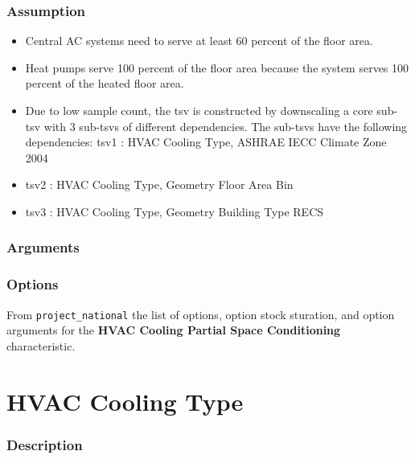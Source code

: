 \subsubsection{Assumption}\label{assumption-37}

\begin{itemize}
 
\item
  Central AC systems need to serve at least 60 percent of the floor
  area.
\item
  Heat pumps serve 100 percent of the floor area because the system
  serves 100 percent of the heated floor area.
\item
  Due to low sample count, the tsv is constructed by downscaling a core
  sub-tsv with 3 sub-tsvs of different dependencies. The sub-tsvs have
  the following dependencies: tsv1 : \textquotesingle HVAC Cooling
  Type\textquotesingle, \textquotesingle ASHRAE IECC Climate Zone
  2004\textquotesingle{}
\item
  tsv2 : \textquotesingle HVAC Cooling Type\textquotesingle,
  \textquotesingle Geometry Floor Area Bin\textquotesingle{}
\item
  tsv3 : \textquotesingle HVAC Cooling Type\textquotesingle,
  \textquotesingle Geometry Building Type RECS\textquotesingle{}
\end{itemize}

\subsubsection{Arguments}\label{arguments-42}



\subsubsection{Options}\label{options-65}

From \texttt{project\_national} the list of options, option stock
sturation, and option arguments for the \textbf{HVAC Cooling Partial
Space Conditioning} characteristic.



\section{HVAC Cooling Type}\label{hvac_cooling_type}

\subsubsection{Description}\label{description-66}

